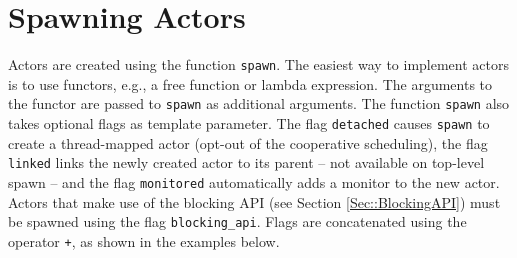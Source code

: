 \section{Spawning Actors}

Actors are created using the function \lstinline^spawn^.
The easiest way to implement actors is to use functors, e.g., a free function or lambda expression.
The arguments to the functor are passed to \lstinline^spawn^ as additional arguments.
The function \lstinline^spawn^ also takes optional flags as template parameter.
The flag \lstinline^detached^ causes \lstinline^spawn^ to create a thread-mapped actor (opt-out of the cooperative scheduling), the flag \lstinline^linked^ links the newly created actor to its parent -- not available on top-level spawn -- and the flag \lstinline^monitored^ automatically adds a monitor to the new actor.
Actors that make use of the blocking API (see Section \ref{Sec::BlockingAPI}) must be spawned using the flag \lstinline^blocking_api^.
Flags are concatenated using the operator \lstinline^+^, as shown in the examples below.

